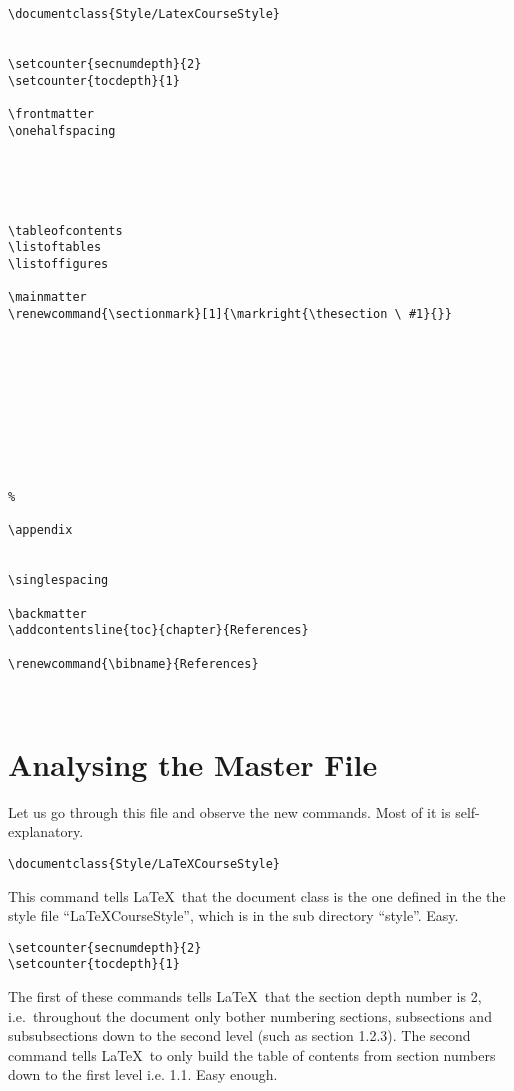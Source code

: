\singlespacing
\pagebreak
\begin{verbatim}
\documentclass{Style/LatexCourseStyle}


\setcounter{secnumdepth}{2}
\setcounter{tocdepth}{1}

\frontmatter
\onehalfspacing





\tableofcontents
\listoftables
\listoffigures

\mainmatter
\renewcommand{\sectionmark}[1]{\markright{\thesection \ #1}{}}










%

\appendix


\singlespacing

\backmatter
\addcontentsline{toc}{chapter}{References}

\renewcommand{\bibname}{References}



\end{verbatim}
\onehalfspacing
\pagebreak

\section{Analysing the Master File}
Let us go through this file and observe the new commands. Most of it is self-explanatory.

\begin{verbatim}
\documentclass{Style/LaTeXCourseStyle}
\end{verbatim}

This command tells \LaTeX\ that the document class is the one defined in the the style file ``LaTeXCourseStyle'', which is in the sub directory ``style''.  Easy.

\begin{verbatim}
\setcounter{secnumdepth}{2}
\setcounter{tocdepth}{1}
\end{verbatim}

The first of these commands tells \LaTeX\ that the section depth number is 2, i.e.~throughout the document only bother numbering sections, subsections and subsubsections down to the second level (such as section 1.2.3). The second command tells \LaTeX\ to only build the table of contents from section numbers down to the first level i.e. 1.1.  Easy enough.

